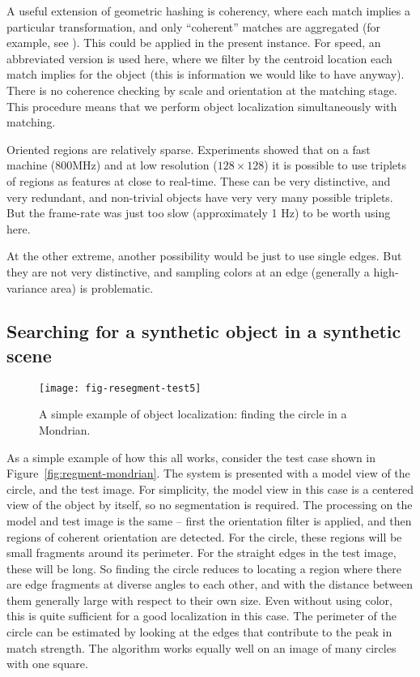 
A useful extension of geometric hashing is coherency, where
each match implies a particular transformation, and only ``coherent''
matches are aggregated (for example, see \cite{lamiroy96rapid}).
%
This could be applied in the present instance.  For speed, an
abbreviated version is used here, where we filter by the centroid
location each match implies for the object (this is information we
would like to have anyway).  There is no coherence checking by scale
and orientation at the matching stage.  
%
This procedure means that we perform object localization
simultaneously with matching.

Oriented regions are relatively sparse.  Experiments showed that on a
fast machine (800MHz) and at low resolution ($128\times 128$) it is
possible to use triplets of regions as features at close to real-time.
These can be very distinctive, and very redundant, and non-trivial
objects have very very many possible triplets.  But the frame-rate
was just too slow (approximately 1 Hz) to be worth using here.

At the other extreme, another possibility would be just to use single
edges.  But they are not very distinctive, and sampling colors at an
edge (generally a high-variance area) is problematic.


\subsection{Searching for a synthetic object in a synthetic scene}


\begin{figure}[tb]
\centerline{\texttt{[image: fig-resegment-test5]}}
\caption[Another example]{ 
%
%
A simple example of object localization: finding the circle in a
Mondrian.  
%
}
\end{figure}


As a simple example of how this all works,
consider the test case shown in Figure~\ref{fig:regment-mondrian}.
The system is presented with a model view of the
circle, and the test image.  For simplicity, the model view in 
this case is a centered view of the object by itself, so no
segmentation is required.  The processing on the model and
test image is the same -- first the orientation filter is applied, and
then regions of coherent orientation are detected.
For the circle, these regions will be small fragments around its
perimeter.  For the straight edges in the test image, these will
be long.  So finding the circle reduces to locating a region
where there are edge fragments at diverse angles to each other,
and with the distance between them generally large with respect
to their own size.  Even without using color, this is quite sufficient
for a good localization in this case.  The perimeter
of the circle can be estimated by looking at the edges that
contribute to the peak in match strength.
The algorithm works equally well on an image of many circles
with one square.


